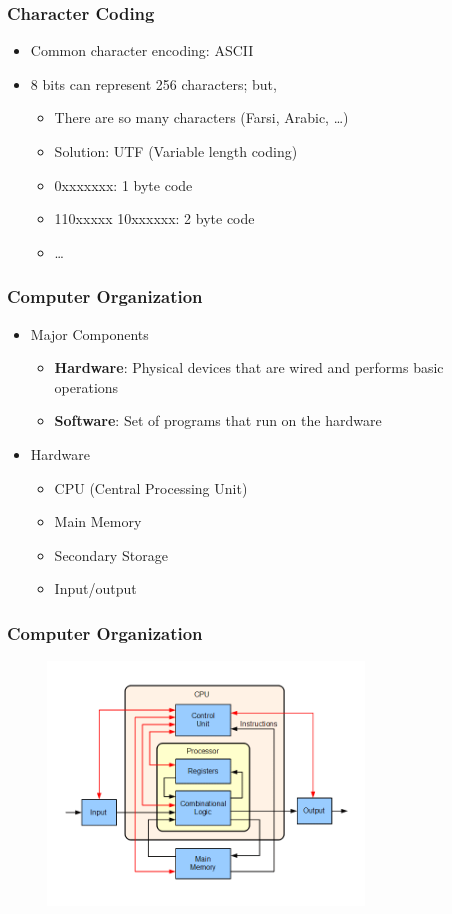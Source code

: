 \documentclass{../c-lecture}
\begin{document}
\begin{frame}
  \frametitle{Character Coding}
    \begin{itemize}
    \item Common character encoding: {\color{Green} ASCII}
    \item 8 bits can represent 256 characters; but,
    \begin{itemize}
      \item There are so many characters (Farsi, Arabic, \ldots)
      \item Solution: UTF (Variable length coding)
      \item 0xxxxxxx: 1 byte code
      \item 110xxxxx 10xxxxxx: 2 byte code
      \item \ldots
    \end{itemize}
  \end{itemize}
\end{frame}

\begin{frame}
  \frametitle{Computer Organization}

  \begin{itemize}
    \item Major Components
    \begin{itemize}
      \item \textbf{Hardware}:
      Physical devices that are wired and performs basic operations
      \item \textbf{Software}:
      Set of programs that run on the hardware
    \end{itemize}
    \item Hardware
    \begin{itemize}
      \item CPU (Central Processing Unit)
      \item Main Memory
      \item Secondary Storage
      \item Input/output
    \end{itemize}
  \end{itemize}
\end{frame}

\begin{frame}
  \frametitle{Computer Organization}
  \begin{figure}
    \includegraphics[width=0.75\textwidth]{./img/basic.png}
  \end{figure}
\end{frame}
\end{document}
